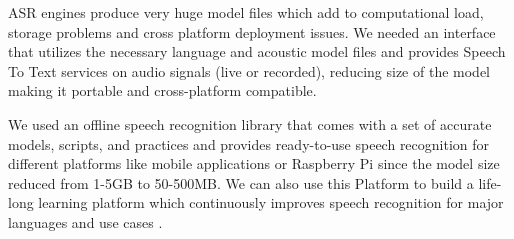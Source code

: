 ASR engines produce very huge model files which add to computational load, storage problems and cross platform deployment issues. We needed an interface that utilizes the necessary language and acoustic model files and provides Speech To Text services on audio signals (live or recorded),  reducing size of the model making it portable and cross-platform compatible. 

We used an offline speech recognition library that comes with a set of accurate models, scripts, and practices and provides ready-to-use speech recognition for different platforms like mobile applications or Raspberry Pi since the model size reduced from 1-5GB to 50-500MB. We can also use this Platform to build a life-long learning platform \cite{eeckt_continual_2021} which continuously improves speech recognition for major languages and use cases \cite{alphacep_vosk_2022}.
